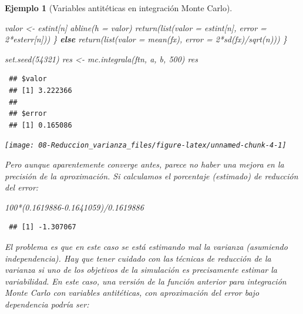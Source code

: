 \documentclass[
]{book}
\newenvironment{Shaded}{\begin{snugshade}}{\end{snugshade}}
\newcommand{\AttributeTok}[1]{\textcolor[rgb]{0.77,0.63,0.00}{#1}}
\newcommand{\ControlFlowTok}[1]{\textcolor[rgb]{0.13,0.29,0.53}{\textbf{#1}}}
\newcommand{\DecValTok}[1]{\textcolor[rgb]{0.00,0.00,0.81}{#1}}
\newcommand{\FloatTok}[1]{\textcolor[rgb]{0.00,0.00,0.81}{#1}}
\newcommand{\FunctionTok}[1]{\textcolor[rgb]{0.00,0.00,0.00}{#1}}
\newcommand{\NormalTok}[1]{#1}
\newcommand{\OtherTok}[1]{\textcolor[rgb]{0.56,0.35,0.01}{#1}}
\newcommand{\SpecialCharTok}[1]{\textcolor[rgb]{0.00,0.00,0.00}{#1}}
\theoremstyle{break}
\newtheorem{example}{Ejemplo}[chapter]
\theoremstyle{nonumberplain}
\begin{document}
\begin{example}[Variables antitéticas en integración Monte Carlo]
\begin{Shaded}
\begin{Highlighting}[]
\NormalTok{    valor }\OtherTok{\textless{}{-}}\NormalTok{ estint[n]}
    \FunctionTok{abline}\NormalTok{(}\AttributeTok{h =}\NormalTok{ valor)}
    \FunctionTok{return}\NormalTok{(}\FunctionTok{list}\NormalTok{(}\AttributeTok{valor =}\NormalTok{ estint[n], }\AttributeTok{error =} \DecValTok{2}\SpecialCharTok{*}\NormalTok{esterr[n]))}
\NormalTok{  \} }\ControlFlowTok{else} \FunctionTok{return}\NormalTok{(}\FunctionTok{list}\NormalTok{(}\AttributeTok{valor =} \FunctionTok{mean}\NormalTok{(fx), }\AttributeTok{error =} \DecValTok{2}\SpecialCharTok{*}\FunctionTok{sd}\NormalTok{(fx)}\SpecialCharTok{/}\FunctionTok{sqrt}\NormalTok{(n)))}
\NormalTok{\}}

\FunctionTok{set.seed}\NormalTok{(}\DecValTok{54321}\NormalTok{)}
\NormalTok{res }\OtherTok{\textless{}{-}} \FunctionTok{mc.integrala}\NormalTok{(ftn, a, b, }\DecValTok{500}\NormalTok{)}
\NormalTok{res}
\end{Highlighting}
\end{Shaded}

\begin{verbatim}
 ## $valor
 ## [1] 3.222366
 ## 
 ## $error
 ## [1] 0.165086
\end{verbatim}

\begin{center}\texttt{[image: 08-Reduccion\_varianza\_files/figure-latex/unnamed-chunk-4-1]} \end{center}

Pero aunque aparentemente converge antes, parece no haber una mejora en la precisión de la aproximación.
Si calculamos el porcentaje (estimado) de reducción del error:

\begin{Shaded}
\begin{Highlighting}[]
\DecValTok{100}\SpecialCharTok{*}\NormalTok{(}\FloatTok{0.1619886{-}0.1641059}\NormalTok{)}\SpecialCharTok{/}\FloatTok{0.1619886}
\end{Highlighting}
\end{Shaded}

\begin{verbatim}
 ## [1] -1.307067
\end{verbatim}

El problema es que en este caso se está estimando mal la varianza (asumiendo independencia).
Hay que tener cuidado con las técnicas de reducción de la varianza si uno de los objetivos de la simulación es precisamente estimar la variabilidad.
En este caso, una versión de la función anterior para integración Monte Carlo con variables antitéticas, con aproximación del error bajo dependencia podría ser:


\end{example}
\end{document}
